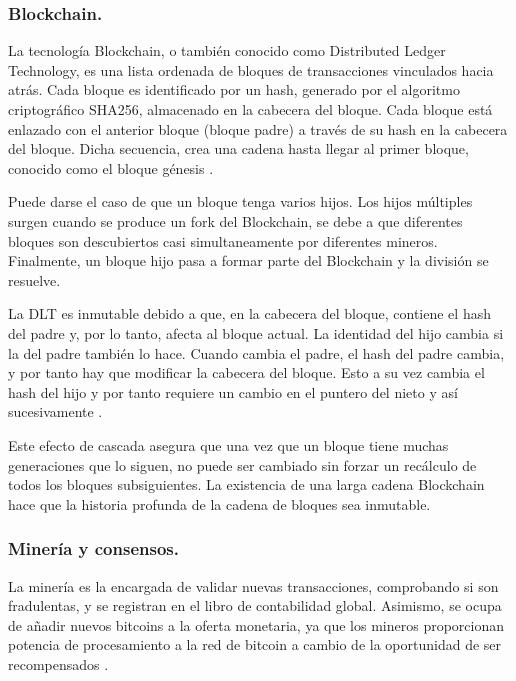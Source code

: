 \subsubsection{Blockchain.}

La tecnología Blockchain, o también conocido como Distributed Ledger Technology, es una lista ordenada de bloques de 
transacciones vinculados hacia atrás. Cada bloque es identificado por un hash, generado por el algoritmo criptográfico 
SHA256, almacenado en la cabecera del bloque. Cada bloque está enlazado con el anterior bloque (bloque padre) a través 
de su hash en la cabecera del bloque. Dicha secuencia, crea una cadena hasta llegar al primer bloque, conocido como 
el bloque génesis \cite{antonopoulos2014mastering}.

\vspace{5mm}

\noindent Puede darse el caso de que un bloque tenga varios hijos. Los hijos múltiples surgen cuando se produce un fork 
del Blockchain, se debe a que diferentes bloques son descubiertos casi simultaneamente por diferentes mineros. 
Finalmente, un bloque hijo pasa a formar parte del Blockchain y la división se resuelve. 

\vspace{5mm}

\noindent La DLT es inmutable debido a que, en la cabecera del bloque, contiene el hash del padre y, por lo tanto, 
afecta al bloque actual. La identidad del hijo cambia si la del padre también lo hace. Cuando cambia el padre, el 
hash del padre cambia, y por tanto hay que modificar la cabecera del bloque. Esto a su vez cambia el hash del hijo y 
por tanto requiere un cambio en el puntero del nieto y así sucesivamente \cite{antonopoulos2014mastering}.

\vspace{5mm}

\noindent Este efecto de cascada asegura que una vez que un bloque tiene muchas generaciones que lo siguen, no puede 
ser cambiado sin forzar un recálculo de todos los bloques subsiguientes. La existencia de una larga cadena Blockchain 
hace que la historia profunda de la cadena de bloques sea inmutable.

\subsubsection{Minería y consensos.}

La minería es la encargada de validar nuevas transacciones, comprobando si son fradulentas, y se registran en el 
libro de contabilidad global. Asimismo, se ocupa de añadir nuevos bitcoins a la oferta monetaria, ya que los 
mineros proporcionan potencia de procesamiento a la red de bitcoin a cambio de la oportunidad de ser recompensados 
\cite{antonopoulos2014mastering}.


